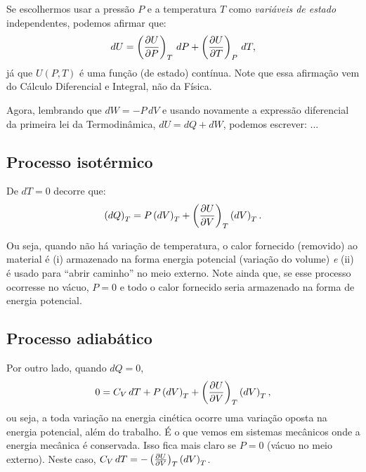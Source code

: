 \documentclass[a4paper,12pt]{scrartcl}
\begin{document}
  Se escolhermos usar a pressão $P$ e a temperatura $T$ como \emph{variáveis de estado} independentes, podemos afirmar que:
  \begin{equation*}
  dU = \left(\frac{\partial U}{\partial P}\right)_{T}\, dP + \left(\frac{\partial U}{\partial T}\right)_{P}\, dT,
  \end{equation*}
  já que $U(P,T)$ é uma função (de estado) contínua. Note que essa afirmação vem do Cálculo Diferencial e Integral, não da Física.
  
  Agora, lembrando que $dW = -P\, dV$ e usando novamente a expressão diferencial da primeira lei da Termodinâmica, $dU = dQ + dW$, podemos escrever: ...
  
  
  \subsection*{Processo isotérmico}
  
  De $dT = 0$ decorre que:
  \begin{equation*}
  \left(dQ\right)_T = P\left(dV\right)_T + \left(\frac{\partial U}{\partial V}\right)_{T}\left(dV\right)_T.
  \end{equation*}
  
  Ou seja, quando não há variação de temperatura, o calor fornecido (removido) ao material é (i) armazenado na forma energia potencial (variação do volume) \emph{e} (ii) é usado para ``abrir caminho'' no meio externo. Note ainda que, se esse processo ocorresse no vácuo, $P = 0$ e todo o calor fornecido seria armazenado na forma de energia potencial.
  
  \subsection*{Processo adiabático}
  
  Por outro lado, quando $dQ = 0$,
  \begin{equation*}
  0 = C_V\, dT + P\left(dV\right)_T + \left(\frac{\partial U}{\partial V}\right)_{T}\left(dV\right)_T,
  \end{equation*}
  ou seja, a toda variação na energia cinética ocorre uma variação oposta na energia potencial, além do trabalho. É o que vemos em sistemas mecânicos onde a energia mecânica é conservada. Isso fica mais claro se $P = 0$ (vácuo no meio externo). Neste caso, $C_V\, dT = - \left(\frac{\partial U}{\partial V}\right)_{T}\left(dV\right)_T$.
  

  
  
  
\end{document}
